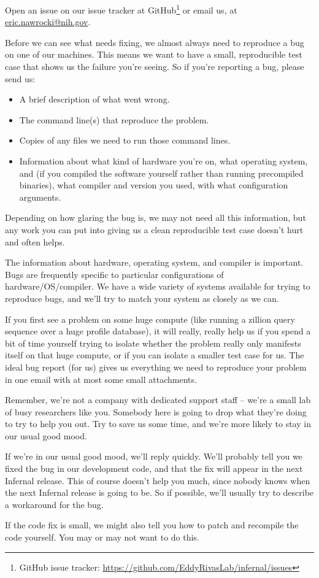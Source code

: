 Open an issue on our issue tracker at GitHub\footnote{GitHub issue
  tracker: \url{https://github.com/EddyRivasLab/infernal/issues}} or email us,
at \url{eric.nawrocki@nih.gov}.

Before we can see what needs fixing, we almost always need to
reproduce a bug on one of our machines. This means we want to have a
small, reproducible test case that shows us the failure you're seeing.
So if you're reporting a bug, please send us:

\begin{itemize}
 \item A brief description of what went wrong.
 \item The command line(s) that reproduce the problem.
 \item Copies of any files we need to run those command lines.
 \item Information about what kind of hardware you're on, what
   operating system, and (if you compiled the software yourself rather
   than running precompiled binaries), what compiler and version you
   used, with what configuration arguments.
\end{itemize}

Depending on how glaring the bug is, we may not need all this
information, but any work you can put into giving us a clean
reproducible test case doesn't hurt and often helps.

The information about hardware, operating system, and compiler is
important. Bugs are frequently specific to particular configurations
of hardware/OS/compiler.  We have a wide variety of systems available
for trying to reproduce bugs, and we'll try to match your system as
closely as we can.

If you first see a problem on some huge compute (like running a
zillion query sequence over a huge profile database), it will really,
really help us if you spend a bit of time yourself trying to isolate
whether the problem really only manifests itself on that huge compute,
or if you can isolate a smaller test case for us. The ideal bug report
(for us) gives us everything we need to reproduce your problem in one
email with at most some small attachments. 

Remember, we're not a company with dedicated support staff -- we're a
small lab of busy researchers like you. Somebody here is going to drop
what they're doing to try to help you out. Try to save us some time,
and we're more likely to stay in our usual good mood.

If we're in our usual good mood, we'll reply quickly.  We'll probably
tell you we fixed the bug in our development code, and that the fix
will appear in the next Infernal release. This of course doesn't help you
much, since nobody knows when the next Infernal release is going to be.
So if possible, we'll usually try to describe a workaround for the
bug.

If the code fix is small, we might also tell you how to patch and
recompile the code yourself. You may or may not want to do this.













  









